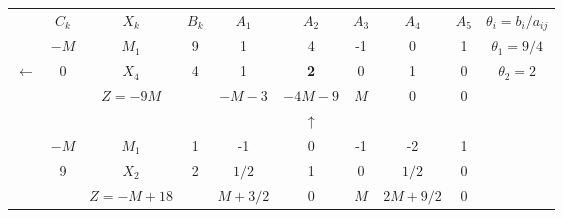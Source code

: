     \begin{tabular}{cccccccccc}
\cline{2-10}            & $C_k$   & $X_k$   & $B_k$   & $A_1$   & $A_2$   & $A_3$   & $A_4$   & $A_5$   & $\theta_i = b_i/a_{ij}$ \bigstrut\\
\cline{2-10}            & $-M$    & $M_1$   & 9       & 1       & 4       & -1      & 0       & 1       & $\theta_1 = 9/4$ \bigstrut[t]\\
    $\leftarrow$ & 0       & \textcolor[rgb]{ 1,  0,  0}{\boldmath{}\textbf{$X_4$}\unboldmath{}} & 4       & 1       & \textbf{2} & 0       & 1       & 0       & \boldmath{}\textbf{$\theta_2 = 2$}\unboldmath{} \bigstrut[b]\\
\cline{2-10}            &         & $Z=-9M$ &         & $-M-3$  & \textcolor[rgb]{ 0,  .439,  .753}{\boldmath{}\textbf{$-4M-9$}\unboldmath{}} & $M$     & 0       & 0       &  \bigstrut\\
\cline{2-10}            &         &         &         &         & $\uparrow$ &         &         &         &  \bigstrut\\
\cline{2-10}            & $-M$    & $M_1$   & 1       & -1      & 0       & -1      & -2      & 1       &  \bigstrut[t]\\
            & 9       & $X_2$   & 2       & $1/2$   & 1       & 0       & $1/2$   & 0       &  \bigstrut[b]\\
\cline{2-10}            &         & $Z=-M+18$ &         & $M+3/2$ & 0       & $M$     & $2M+9/2$ & 0       &  \bigstrut\\
\cline{2-10}    \end{tabular}%
